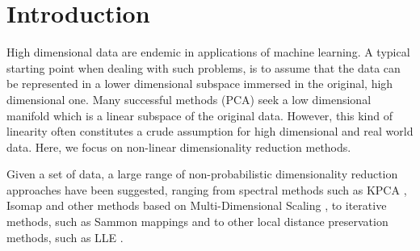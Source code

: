 
\section{Introduction}
%
%
%
%
%
%
%

High dimensional data are endemic in applications of machine learning.
  A typical starting point when dealing with such problems,
 is to assume that the data can be represented in a lower dimensional subspace immersed in the original, high dimensional
 one. Many successful methods (\eg PCA) seek a low dimensional manifold which is a linear subspace of the 
original data. However, this kind of linearity often constitutes a crude assumption for high dimensional and real world 
data. Here, we focus on non-linear dimensionality reduction methods.


Given a set of data, a large
range of non-probabilistic dimensionality reduction approaches have been
suggested, ranging from spectral methods such as KPCA \citep{Scholkopf:kernelpca97}, Isomap \citep{Tenenbaum:isomap00}
and other methods based on Multi-Dimensional Scaling \citep{Mardia:multivariate79}, to  iterative methods, such as Sammon mappings
\citep{Sammon:nonlinear69} and to other local distance preservation methods, such as LLE \citep{Roweis:lle00}.

